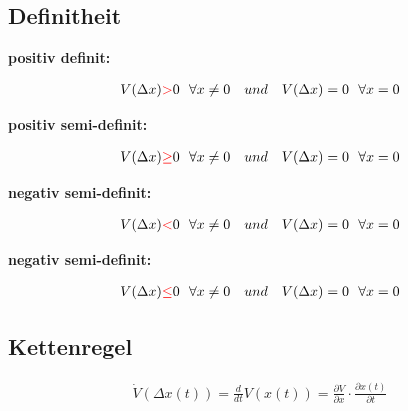 \documentclass[10pt,a4paper]{article}
\begin{document}
  \subsection{Definitheit}
  \textbf{positiv definit:}
  \begin{mdframed}[style=exercise]
    \begin{align}
        V(\Delta x)  \textcolor{red}{>} 0 \ \ \forall x \neq 0 \ \ \ und \ \ \ V(\Delta x) = 0 \ \ \forall x = 0
    \end{align}
  \end{mdframed}
  \textbf{positiv semi-definit:}
  \begin{mdframed}[style=exercise]
    \begin{align}
        V(\Delta x) \textcolor{red}{\geq} 0 \ \ \forall x \neq 0 \ \ \ und \ \ \ V(\Delta x) = 0 \ \ \forall x = 0
    \end{align}
  \end{mdframed}
  \textbf{negativ semi-definit:}
  \begin{mdframed}[style=exercise]
    \begin{align}
        V(\Delta x) \textcolor{red}{<} 0 \ \ \forall x \neq 0 \ \ \ und \ \ \ V(\Delta x) = 0 \ \ \forall x = 0 
    \end{align}
  \end{mdframed}
  \textbf{negativ semi-definit:}
  \begin{mdframed}[style=exercise]
    \begin{align}
        V(\Delta x) \textcolor{red}{\leq} 0 \ \ \forall x \neq 0 \ \ \ und \ \ \ V(\Delta x) = 0 \ \ \forall x = 0 
    \end{align}
  \end{mdframed}

  \subsection{Kettenregel}
  \begin{mdframed}[style=exercise]
    \begin{align}
        \dot{V}(\Delta x(t)) = \frac{d}{dt}V(x(t)) =\frac{\partial V}{\partial x} \cdot \frac{\partial x(t)}{\partial t}  
    \end{align}
  \end{mdframed}
\end{document}
